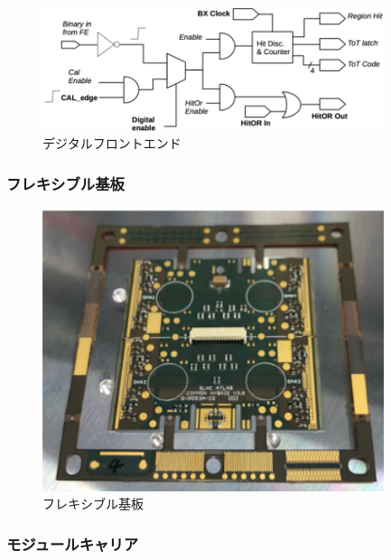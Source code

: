 \begin{figure}[bpt]\centering
\includegraphics[width=10cm]{digital_fe}
\caption[デジタルフロントエンド]{デジタルフロントエンド\cite{2-1}}
\label{digital_fe}
\end{figure}

\subsubsection{フレキシブル基板}

\begin{figure}[bpt]\centering
\includegraphics[width=10cm]{pcb}
\caption[フレキシブル基板]{フレキシブル基板}
\label{pcb}
\end{figure}

\subsubsection{モジュールキャリア}


